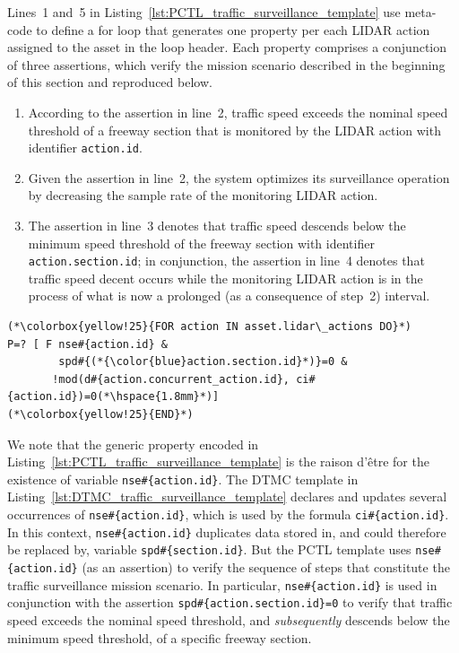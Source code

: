 Lines~1 and~5 in Listing~\ref{lst:PCTL_traffic_surveillance_template} use meta-code to define a for loop that generates one property per each LIDAR action assigned to the asset in the loop header. Each property comprises a conjunction of three assertions, which verify the mission scenario described in the beginning of this section and reproduced below.

\begin{enumerate}

\item According to the assertion in line~2, traffic speed exceeds the nominal speed threshold of a freeway section that is monitored by the LIDAR action with identifier \texttt{action.id}.

\item Given the assertion in line~2, the system optimizes its surveillance operation by decreasing the sample rate of the monitoring LIDAR action.

\item The assertion in line~3 denotes that traffic speed descends below the minimum speed threshold of the freeway section with identifier \texttt{action.section.id}; in conjunction, the assertion in line~4 denotes that traffic speed decent occurs while the monitoring LIDAR action is in the process of what is now a prolonged (as a consequence of step~2) interval.

\end{enumerate}

\begin{lstlisting}[caption={PCTL template for traffic surveillance},label=lst:PCTL_traffic_surveillance_template]
(*\colorbox{yellow!25}{FOR action IN asset.lidar\_actions DO}*)
P=? [ F nse#{action.id} &
        spd#{(*{\color{blue}action.section.id}*)}=0 &
       !mod(d#{action.concurrent_action.id}, ci#{action.id})=0(*\hspace{1.8mm}*)]
(*\colorbox{yellow!25}{END}*)
\end{lstlisting}

We note that the generic property encoded in Listing~\ref{lst:PCTL_traffic_surveillance_template} is the raison d'\^{e}tre for the existence of variable \texttt{nse\#\{action.id\}}. The DTMC template in Listing~\ref{lst:DTMC_traffic_surveillance_template} declares and updates several occurrences of \texttt{nse\#\{action.id\}}, which is used by the formula \texttt{ci\#\{action.id\}}. In this context, \texttt{nse\#\{action.id\}} duplicates data stored in, and could therefore be replaced by, variable \texttt{spd\#\{section.id\}}. But the PCTL template uses \texttt{nse\#\{action.id\}} (as an assertion) to verify the sequence of steps that constitute the traffic surveillance mission scenario. In particular, \texttt{nse\#\{action.id\}} is used in conjunction with the assertion \texttt{spd\#\{action.section.id\}=0} to verify that traffic speed exceeds the nominal speed threshold, and \emph{subsequently} descends below the minimum speed threshold, of a specific freeway section.


